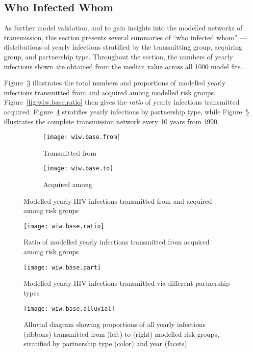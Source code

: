 \subsection{Who Infected Whom}\label{sr.cal.wiw}
As further model validation, and to gain insights into the modelled networks of transmission,
this section presents several summaries of ``who infected whom''
--- \ie distributions of yearly infections stratified by
the transmitting group, acquiring group, and partnership type.
Throughout the section, the numbers of yearly infections shown are obtained from
the median value across all 1000 model fits.
\par
Figure~\ref{fig:wiw.base.frto} illustrates
the total numbers and proportions of modelled yearly infections
transmitted from  and
acquired among  modelled risk groups.
Figure~\ref{fig:wiw.base.ratio} then gives
the \emph{ratio} of yearly infections transmitted \vs acquired.
Figure~\ref{fig:wiw.base.part} stratifies yearly infections by partnership type, while
Figure~\ref{fig:wiw.base.alluvial} illustrates
the complete transmission network every 10 years from 1990.
\begin{figure}
  \begin{subfigure}{.5\linewidth}
    \texttt{[image: wiw.base.from]}
    \caption{Transmitted from}
    \label{fig:wiw.base.from}
  \end{subfigure}%
  \begin{subfigure}{.5\linewidth}
    \texttt{[image: wiw.base.to]}
    \caption{Acquired among}
    \label{fig:wiw.base.to}
  \end{subfigure}
  \caption{Modelled yearly HIV infections
     transmitted from and  acquired among risk groups}
  \label{fig:wiw.base.frto}
\end{figure}
\begin{figure}
  \begin{minipage}[b]{.49\linewidth}
    \texttt{[image: wiw.base.ratio]}
    \caption{Ratio of modelled yearly infections transmitted from \vs acquired among risk groups}
    \label{fig:wiw.base.ratio}
  \end{minipage}\hfill
  \begin{minipage}[b]{.49\linewidth}
    \texttt{[image: wiw.base.part]}
    \caption{Modelled yearly HIV infections transmitted via different partnership types}
    \label{fig:wiw.base.part}
  \end{minipage}
\end{figure}
\begin{figure}
  \texttt{[image: wiw.base.alluvial]}
  \caption{Alluvial diagram showing proportions of all yearly infections (ribbons)
    transmitted from (left) to (right) modelled risk groups,
    stratified by partnership type (color) and year (facets)}
  \label{fig:wiw.base.alluvial}
\end{figure}